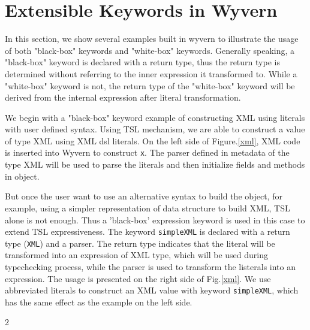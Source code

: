 \documentclass[letterpaper, notitlepage]{article}
\begin{document}
\section{Extensible Keywords in Wyvern}
In this section, we show several examples built in wyvern to illustrate the usage of both "black-box" keywords and "white-box" keywords. Generally speaking, a "black-box" keyword is declared with a return type, thus the return type is determined without referring to the inner expression it transformed to. While a "white-box" keyword is not, the return type of the "white-box" keyword will be derived from the internal expression after literal transformation.
\par
We begin with a "black-box" keyword example of constructing XML using literals with user defined syntax. Using TSL mechanism, we are able to construct a value of type XML using XML dsl literals. On the left side of Figure.\ref{xml}, XML code is inserted into Wyvern to construct \texttt{x}. The parser defined in metadata of the type XML will be used to parse the literals and then initialize fields and methods in object. 
\par
But once the user want to use an alternative syntax to build the object, for example, using a simpler representation of data structure to build XML, TSL alone is not enough. Thus a 'black-box' expression keyword is used in this case to extend TSL expressiveness. The keyword \texttt{simpleXML} is declared with a return type (\texttt{XML}) and a parser. The return type indicates that the literal will be transformed into an expression of XML type, which will be used during typechecking process, while the parser is used to transform the listerals into an expression. The usage is presented on the right side of Fig.\ref{xml}. We use abbreviated literals to construct an XML value with keyword \texttt{simpleXML}, which has the same effect as the example on the left side.

\begin{figure*}[htb!]
\begin{parcolumns}{2}
\end{parcolumns}
\vspace{-10px}
\caption{Building a value of type XML using a TSL providing the standard syntax (left) or using a ``black-box'' expression keyword providing a simpler layout-sensitive syntax (right).}
\label{xml}
\end{figure*}
\end{document}
